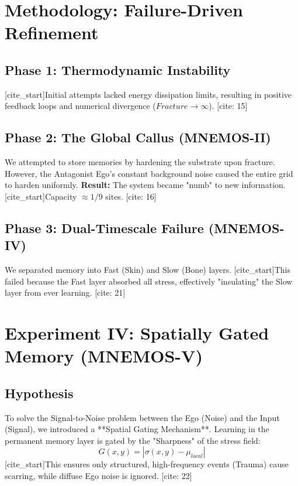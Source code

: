 \documentclass[11pt, a4paper]{article}
\begin{document}
\section{Methodology: Failure-Driven Refinement}

\subsection{Phase 1: Thermodynamic Instability}
[cite_start]Initial attempts lacked energy dissipation limits, resulting in positive feedback loops and numerical divergence ($Fracture \rightarrow \infty$). [cite: 15]

\subsection{Phase 2: The Global Callus (MNEMOS-II)}
We attempted to store memories by hardening the substrate upon fracture. However, the Antagonist Ego's constant background noise caused the entire grid to harden uniformly.
\textbf{Result:} The system became "numb" to new information. [cite_start]Capacity $\approx 1/9$ sites. [cite: 16]

\subsection{Phase 3: Dual-Timescale Failure (MNEMOS-IV)}
We separated memory into Fast (Skin) and Slow (Bone) layers. [cite_start]This failed because the Fast layer absorbed all stress, effectively "insulating" the Slow layer from ever learning. [cite: 21]

\section{Experiment IV: Spatially Gated Memory (MNEMOS-V)}

\subsection{Hypothesis}
To solve the Signal-to-Noise problem between the Ego (Noise) and the Input (Signal), we introduced a **Spatial Gating Mechanism**. Learning in the permanent memory layer is gated by the "Sharpness" of the stress field:
\[ G(x,y) = |\sigma(x,y) - \mu_{local}| \]
[cite_start]This ensures only structured, high-frequency events (Trauma) cause scarring, while diffuse Ego noise is ignored. [cite: 22]
\end{document}

